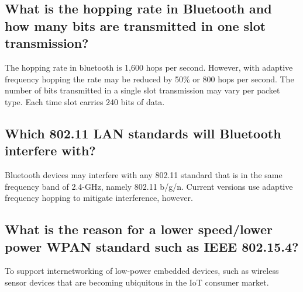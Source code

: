 \documentclass[a4paper]{report}
\begin{document}
\subsection{What is the hopping rate in Bluetooth and how many bits are
            transmitted in one slot transmission?}

The hopping rate in bluetooth is 1,600 hops per second. However, with adaptive frequency hopping
the rate may be reduced by 50\% or 800 hops per second.  The number of bits transmitted in a single
slot transmission may vary per packet type. Each time slot carries 240 bits of data. 

\subsection{Which 802.11 LAN standards will Bluetooth interfere with?}

Bluetooth devices may interfere with any 802.11 standard that is in the same frequency band of 2.4-GHz, namely 802.11 b/g/n.
Current versions use adaptive frequency hopping to mitigate interference, however.

\subsection{What is the reason for a lower speed/lower power WPAN standard
            such as IEEE 802.15.4?}

To support internetworking of low-power embedded devices, such as wireless sensor devices that are becoming ubiquitous
in the IoT consumer market.
\end{document}
